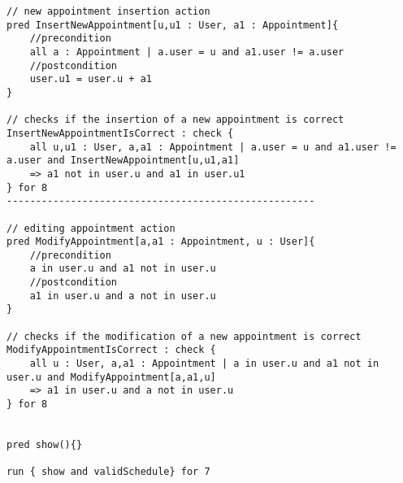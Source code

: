 \begin{lstlisting}
// new appointment insertion action
pred InsertNewAppointment[u,u1 : User, a1 : Appointment]{
	//precondition
	all a : Appointment | a.user = u and a1.user != a.user
	//postcondition
	user.u1 = user.u + a1
}

// checks if the insertion of a new appointment is correct
InsertNewAppointmentIsCorrect : check {
	all u,u1 : User, a,a1 : Appointment | a.user = u and a1.user != a.user and InsertNewAppointment[u,u1,a1] 
	=> a1 not in user.u and a1 in user.u1
} for 8
-----------------------------------------------------

// editing appointment action
pred ModifyAppointment[a,a1 : Appointment, u : User]{
	//precondition
	a in user.u and a1 not in user.u
	//postcondition
	a1 in user.u and a not in user.u
}

// checks if the modification of a new appointment is correct
ModifyAppointmentIsCorrect : check {
	all u : User, a,a1 : Appointment | a in user.u and a1 not in user.u and ModifyAppointment[a,a1,u]
	=> a1 in user.u and a not in user.u
} for 8


pred show(){}

run { show and validSchedule} for 7

\end{lstlisting}
